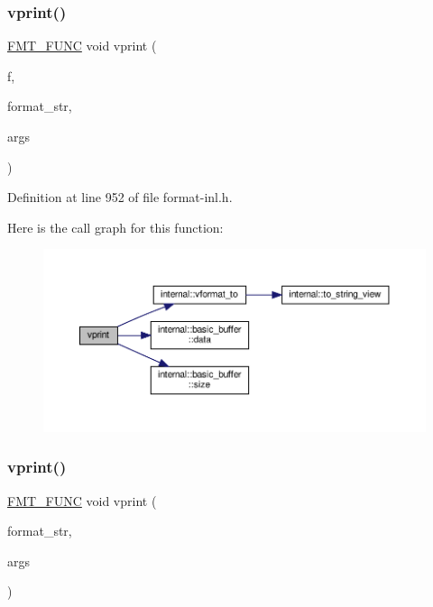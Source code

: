 \subsubsection{\texorpdfstring{vprint()}{vprint()}\hspace{0.1cm}{\footnotesize\ttfamily [2/4]}}
{\footnotesize\ttfamily \hyperlink{format_8h_a02c8898388e0ae59aab58be14fcd4e05}{F\+M\+T\+\_\+\+F\+U\+NC} void vprint (\begin{DoxyParamCaption}\item[{std\+::\+F\+I\+LE $\ast$}]{f,  }\item[{\hyperlink{core_8h_ad7c259380697a46ef799332f3ded429e}{wstring\+\_\+view}}]{format\+\_\+str,  }\item[{\hyperlink{structwformat__args}{wformat\+\_\+args}}]{args }\end{DoxyParamCaption})}



Definition at line 952 of file format-\/inl.\+h.

Here is the call graph for this function\+:
\nopagebreak
\begin{figure}[H]
\begin{center}
\leavevmode
\includegraphics[width=350pt]{format-inl_8h_a263a1a720ae8f902535a6c7a4933841e_cgraph}
\end{center}
\end{figure}
\mbox{\label{format-inl_8h_a77fcf4959d4c69c3800b759696f37248}} 
\subsubsection{\texorpdfstring{vprint()}{vprint()}\hspace{0.1cm}{\footnotesize\ttfamily [3/4]}}
{\footnotesize\ttfamily \hyperlink{format_8h_a02c8898388e0ae59aab58be14fcd4e05}{F\+M\+T\+\_\+\+F\+U\+NC} void vprint (\begin{DoxyParamCaption}\item[{\hyperlink{core_8h_a17e3ff7f9ac2b8f068f719b829890036}{string\+\_\+view}}]{format\+\_\+str,  }\item[{\hyperlink{structformat__args}{format\+\_\+args}}]{args }\end{DoxyParamCaption})}



